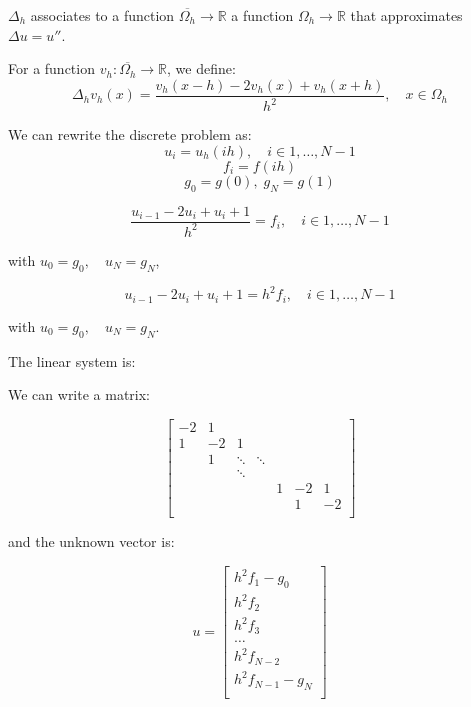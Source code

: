 $\Delta_h$ associates to a function $\overline{\Omega_h} \rightarrow \mathbb{R}$ a function $\Omega_h \rightarrow \mathbb{R}$ that approximates $\Delta u = u''$.

For a function $v_h: \overline{\Omega_h} \rightarrow \mathbb{R}$, we define:
\begin{equation*}
\Delta_h v_h(x) = \frac{v_h(x-h) - 2 v_h(x) + v_h(x+h)}{h^2}, \quad x \in \Omega_h
\end{equation*}

We can rewrite the discrete problem as:
\begin{equation*}
u_i = u_h(ih), \quad i \in {1, \dots, N-1}
\end{equation*}
\begin{equation*}
f_i = f(ih)
\end{equation*}
\begin{equation*}
g_0 = g(0), \; g_N = g(1)
\end{equation*}

\begin{equation*}
\frac{u_{i-1} - 2 u_i + u_i+1}{h^2} = f_i, \quad i \in {1, \dots, N-1}
\end{equation*}

with $u_0 = g_0, \quad u_N = g_N$,

\begin{equation*}
u_{i-1} - 2 u_i + u_i+1 = h^2 f_i, \quad i \in {1, \dots, N-1}
\end{equation*}

with $u_0 = g_0, \quad u_N = g_N$.

The linear system is:

We can write a matrix:

\begin{equation*}
\begin{bmatrix}
-2 &  1 &    &    &    &    &    \\
 1 & -2 &  1 &    &    &    &    \\
   &  1 & \ddots &  \ddots &    &    &    \\
 & & \ddots &   &   & & \\

   &    &    &    &  1 & -2 &  1 \\
   &    &    &    &    &  1 & -2 \\
\end{bmatrix}
\end{equation*}

and the unknown vector is:

\begin{equation*}
u = \begin{bmatrix}
h^2 f_{1} - g_{0}   \\
h^2 f_{2}           \\
h^2 f_{3}           \\
\dots               \\
h^2 f_{N-2}         \\
h^2 f_{N-1} - g_{N} \\
\end{bmatrix}
\end{equation*}

